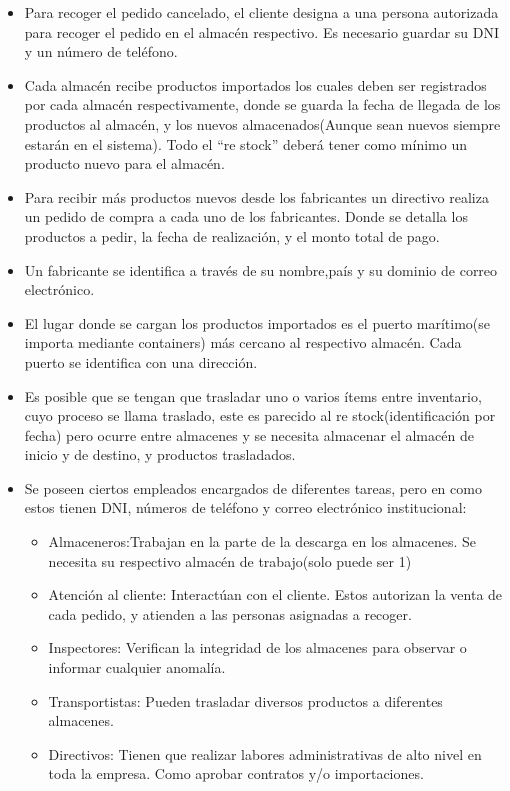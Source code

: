 \documentclass[10pt, a4paper,openany]{report}
\begin{document}
\begin{itemize}
	\item Para recoger el pedido cancelado, el cliente designa a una persona autorizada para recoger el pedido en el almacén respectivo. Es necesario guardar su DNI y un número de teléfono.
	\item Cada almacén recibe productos importados los cuales deben ser registrados por cada almacén respectivamente, donde se guarda la fecha de llegada de los productos al almacén, y los nuevos almacenados(Aunque sean nuevos siempre estarán en el sistema). Todo el “re stock” deberá tener como  mínimo un producto nuevo para el almacén.
	\item Para recibir más productos nuevos desde los fabricantes un directivo realiza un pedido de compra a cada uno de los fabricantes. Donde se detalla los productos a pedir, la fecha de realización, y el monto total de pago.
	\item Un fabricante se identifica a través de su nombre,país y su dominio de correo electrónico.
	\item El lugar donde se cargan los productos importados es el puerto marítimo(se importa mediante containers)  más cercano al respectivo almacén. Cada puerto se identifica con una dirección.
	\item Es posible que se tengan que trasladar uno o varios ítems entre inventario, cuyo proceso se llama traslado, este es parecido al re stock(identificación  por fecha) pero ocurre entre almacenes y se necesita almacenar el almacén de inicio y de destino, y productos trasladados.
	\item Se poseen ciertos empleados encargados de diferentes tareas, pero en como estos tienen DNI, números de teléfono y correo electrónico institucional:
	      \begin{itemize}
		      \item Almaceneros:Trabajan en la parte de la descarga en los almacenes. Se necesita su respectivo almacén de trabajo(solo puede ser 1)
		      \item Atención al cliente: Interactúan con el cliente. Estos autorizan la venta de cada pedido, y atienden a las personas asignadas a recoger.
		      \item Inspectores: Verifican la integridad de los almacenes para observar o informar cualquier anomalía.
		      \item Transportistas: Pueden trasladar diversos productos a diferentes almacenes.
		      \item Directivos: Tienen que realizar labores administrativas de alto nivel en toda la empresa. Como aprobar contratos y/o importaciones.


\end{itemize}
\end{itemize}
\end{document}
